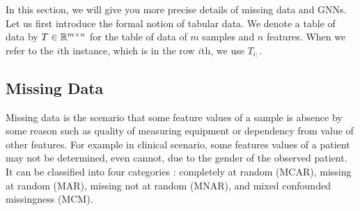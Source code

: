 In this section, we will give you more precise details of missing data and GNNs.
Let us first introduce the formal notion of tabular data.
We denote a table of data by $T \in \mathbb{R}^{m\times n}$ for the table of data of $m$ samples and $n$ features.
When we refer to the $i$th instance, which is in the row $i$th, we use $T_{i:}$.

%

\subsection{Missing Data}
Missing data is the scenario that some feature values of a sample is absence by some reason such as quality of measuring equipment or dependency from value of other features.
For example in clinical scenario, some features values of a patient may not be determined, even cannot, due to the gender of the observed patient.
It can be classified into four categories \cite{Rubin, MCM}: completely at random (MCAR), missing at random (MAR), missing not at random (MNAR), and mixed confounded missingness (MCM).

